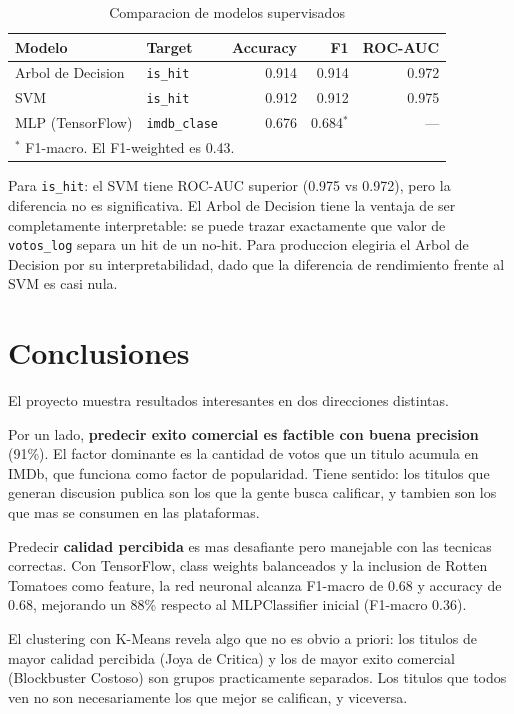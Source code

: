 \documentclass[12pt, a4paper]{article}
\begin{document}
\begin{table}[H]
\centering
\caption{Comparacion de modelos supervisados}
\begin{tabular}{llrrr}
\toprule
\textbf{Modelo} & \textbf{Target} & \textbf{Accuracy} & \textbf{F1} & \textbf{ROC-AUC} \\
\midrule
Arbol de Decision & \texttt{is\_hit}     & 0.914 & 0.914 & 0.972 \\
SVM               & \texttt{is\_hit}     & 0.912 & 0.912 & 0.975 \\
\midrule
MLP (TensorFlow)  & \texttt{imdb\_clase} & 0.676 & 0.684$^*$ & --- \\
\bottomrule
\multicolumn{5}{l}{$^*$ F1-macro. El F1-weighted es 0.43.}\\
\end{tabular}
\end{table}

Para \texttt{is\_hit}: el SVM tiene ROC-AUC superior (0.975 vs 0.972), pero la diferencia no es significativa. El Arbol de Decision tiene la ventaja de ser completamente interpretable: se puede trazar exactamente que valor de \texttt{votos\_log} separa un hit de un no-hit. Para produccion elegiria el Arbol de Decision por su interpretabilidad, dado que la diferencia de rendimiento frente al SVM es casi nula.

\section{Conclusiones}

El proyecto muestra resultados interesantes en dos direcciones distintas.

Por un lado, \textbf{predecir exito comercial es factible con buena precision} (91\%). El factor dominante es la cantidad de votos que un titulo acumula en IMDb, que funciona como factor de popularidad. Tiene sentido: los titulos que generan discusion publica son los que la gente busca calificar, y tambien son los que mas se consumen en las plataformas.

Predecir \textbf{calidad percibida} es mas desafiante pero manejable con las tecnicas correctas. Con TensorFlow, class weights balanceados y la inclusion de Rotten Tomatoes como feature, la red neuronal alcanza F1-macro de 0.68 y accuracy de 0.68, mejorando un 88\% respecto al MLPClassifier inicial (F1-macro 0.36).

El clustering con K-Means revela algo que no es obvio a priori: los titulos de mayor calidad percibida (Joya de Critica) y los de mayor exito comercial (Blockbuster Costoso) son grupos practicamente separados. Los titulos que todos ven no son necesariamente los que mejor se califican, y viceversa.
\end{document}
